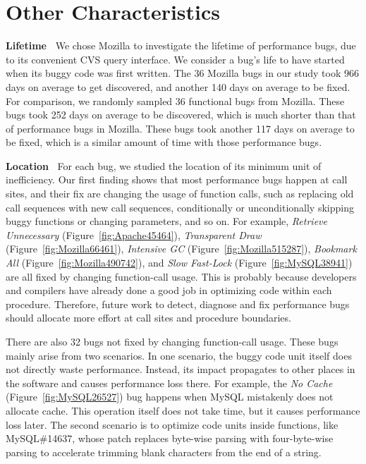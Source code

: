 \section{Other Characteristics}
\label{sec:3_other}

{\bf Lifetime\ } We chose Mozilla to investigate the lifetime of performance bugs, 
due to its convenient CVS query interface.
We consider a bug's life to have started when its buggy code
was first written. The 36 Mozilla bugs in our study
took 966 days on average to get discovered, and another 140 days on average
to be fixed.
For comparison, we randomly sampled 36 functional bugs from Mozilla.
These bugs took 252 days on average to be discovered, which is much shorter 
than that of performance bugs in Mozilla.
These bugs took another 117
days on average to be fixed, which is a similar amount of time with those
performance bugs.


{\bf Location\ }
For each bug, we studied the location of its minimum unit of inefficiency. 
Our first finding shows that 
most performance bugs happen at call sites, and their fix are changing the usage of function calls, 
such as replacing old call sequences with new call sequences, conditionally or unconditionally skipping buggy functions or changing parameters, and so on. 
For example, {\it Retrieve Unnecessary} (Figure~\ref{fig:Apache45464}), {\it Transparent Draw} (Figure~\ref{fig:Mozilla66461}), 
{\it Intensive GC} (Figure~\ref{fig:Mozilla515287}), 
{\it Bookmark All} (Figure~\ref{fig:Mozilla490742}), and
{\it Slow Fast-Lock} (Figure~\ref{fig:MySQL38941}) are all fixed by changing function-call usage. 
This is probably because developers and compilers have already done a good job in optimizing code within each procedure. 
Therefore, future work to detect, 
diagnose and fix performance bugs should allocate more effort at call sites and procedure boundaries. 

There are also 32 bugs not fixed by changing function-call usage. 
These bugs mainly arise from two scenarios. 
In one scenario, the buggy code unit itself does not directly waste performance. 
Instead, its impact propagates to other places in the software and causes performance loss there.  
For example, the {\it No Cache} (Figure~\ref{fig:MySQL26527}) 
bug happens when MySQL mistakenly does not allocate cache. 
This operation itself does not take time, but it causes performance loss later. 
The second scenario is to optimize code units inside functions, like MySQL\#14637, 
whose patch replaces byte-wise parsing with
four-byte-wise parsing to accelerate trimming blank characters from the end of a string.

